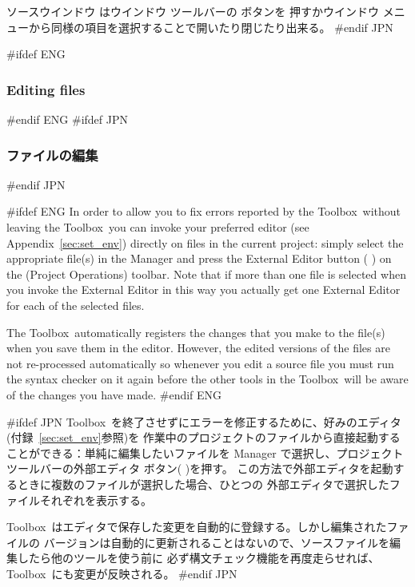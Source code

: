 \documentclass[\pformat,12pt]{article}
\newcommand{\Toolbox}{Toolbox}
\newcommand{\Toolbox}{Toolbox}
\newcommand{\guicmd}[1]{{\sf #1}}
\newcommand{\guicmd}[1]{{\gt #1}}
\begin{document}
\guicmd{ソースウインドウ} は\guicmd{ウインドウ} ツールバーの
ボタンを
押すか\guicmd{ウインドウ} メニューから同様の項目を選択することで開いたり閉じたり出来る。
#endif JPN

#ifdef ENG
\subsubsection{Editing files}
#endif ENG
#ifdef JPN
\subsubsection{ファイルの編集}
#endif JPN

#ifdef ENG
In order to allow you to fix errors reported by the \Toolbox\ without
leaving the \Toolbox\ you can invoke your preferred editor (see
Appendix~\ref{sec:set_env}) directly on files in the current project:
simply select the appropriate file(s) in the \guicmd{Manager} and
press the \guicmd{External Editor} button (%
) 
on the (\guicmd{Project Operations}) toolbar. Note that if more than
one file is selected when you invoke the \guicmd{External Editor} in
this way you actually get one \guicmd{External Editor} for each of the
selected files.

The \Toolbox\ automatically registers the changes that you make to the
file(s) when you save them in the editor. However, the edited versions
of the files are not re-processed automatically so whenever you edit a
source file you must run the syntax checker on it again before the
other tools in the \Toolbox\ will be aware of the changes you have
made.
#endif ENG

#ifdef JPN
\Toolbox\ を終了させずにエラーを修正するために、好みのエディタ(付録~\ref{sec:set_env}参照)を
作業中のプロジェクトのファイルから直接起動することができる：単純に編集したいファイルを
\guicmd{Manager} で選択し、\guicmd{プロジェクト}ツールバーの\guicmd{外部エディタ}
 ボタン(%
)を押す。
この方法で\guicmd{外部エディタ}を起動するときに複数のファイルが選択した場合、ひとつの
\guicmd{外部エディタ}で選択したファイルそれぞれを表示する。

\Toolbox\ はエディタで保存した変更を自動的に登録する。しかし編集されたファイルの
バージョンは自動的に更新されることはないので、ソースファイルを編集したら他のツールを使う前に
必ず構文チェック機能を再度走らせれば、\Toolbox\ にも変更が反映される。
#endif JPN
\end{document}
